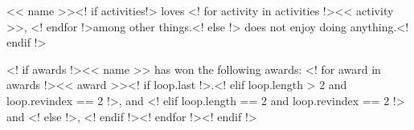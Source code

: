 \documentclass{article}
\begin{document}
<< name >><! if activities!> loves <! for activity in activities !><< activity >>, <! endfor !>among other things.<! else !> does not enjoy doing anything.<! endif !>

<! if awards !><< name >> has won the following awards: <! for award in awards !><< award >><! if loop.last !>.<! elif loop.length > 2 and loop.revindex == 2 !>, and <! elif loop.length == 2 and loop.revindex == 2 !> and <! else !>, <! endif !><! endfor !><! endif !>
\end{document}
